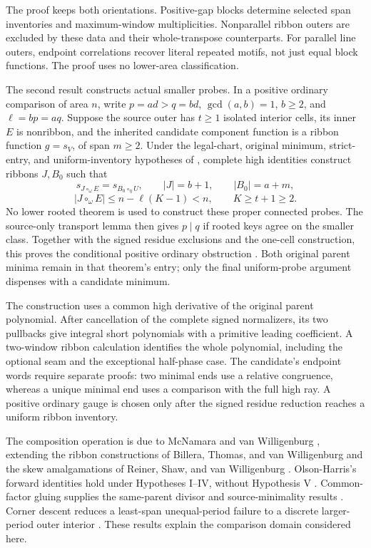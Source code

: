 \documentclass[11pt,a4paper]{amsart}
\numberwithin{equation}{section}
\theoremstyle{plain}
\theoremstyle{definition}
\begin{document}
The proof keeps both orientations.  Positive-gap blocks determine selected span inventories and maximum-window multiplicities.  Nonparallel ribbon outers are excluded by these data and their whole-transpose counterparts.  For parallel line outers, endpoint correlations recover literal repeated motifs, not just equal block functions.  The proof uses no lower-area classification.

The second result constructs actual smaller probes.  In a positive ordinary comparison of area \(n\), write \(p=ad>q=bd\), \(\gcd(a,b)=1\), \(b\ge2\), and \(\ell=bp=aq\).  Suppose the source outer has \(t\ge1\) isolated interior cells, its inner \(E\) is nonribbon, and the inherited candidate component function is a ribbon function \(g=s_V\), of span \(m\ge2\).  Under the legal-chart, original minimum, strict-entry, and uniform-inventory hypotheses of , complete high identities construct ribbons \(J,B_0\) such that
\[
 s_{J\circ_\omega E}=s_{B_0\circ_\eta U},\qquad
 |J|=b+1,\qquad |B_0|=a+m,
\]
\[
 |J\circ_\omega E|\le n-\ell(K-1)<n,\qquad K\ge t+1\ge2.
\]
No lower rooted theorem is used to construct these proper connected probes.  The source-only transport lemma  then gives \(p\mid q\) if rooted keys agree on the smaller class.  Together with the signed residue exclusions and the one-cell construction, this proves the conditional positive ordinary obstruction .  Both original parent minima remain in that theorem's entry; only the final uniform-probe argument dispenses with a candidate minimum.

The construction uses a common high derivative of the original parent polynomial.  After cancellation of the complete signed normalizers, its two pullbacks give integral short polynomials with a primitive leading coefficient.  A two-window ribbon calculation identifies the whole polynomial, including the optional seam and the exceptional half-phase case.  The candidate's endpoint words require separate proofs: two minimal ends use a relative congruence, whereas a unique minimal end uses a comparison with the full high ray.  A positive ordinary gauge is chosen only after the signed residue reduction reaches a uniform ribbon inventory.

The composition operation is due to McNamara and van Willigenburg \cite{McNamara2009Classification}, extending the ribbon constructions of Billera, Thomas, and van Willigenburg \cite{Billera2006DecomposableCompositions} and the skew amalgamations of Reiner, Shaw, and van Willigenburg \cite{Reiner2007Coincidences}.  Olson-Harris's forward identities hold under Hypotheses I--IV, without Hypothesis V \cite[Thms.~5.3.9 and~5.3.10]{OlsonHarris2024HopfApplications}.  Common-factor gluing supplies the same-parent divisor and source-minimality results \cite{Shields2026Gluing}.  Corner descent reduces a least-span unequal-period failure to a discrete larger-period outer interior \cite{Shields2026CornerDescent}.  These results explain the comparison domain considered here.
\end{document}

